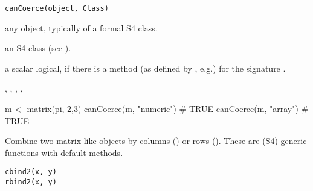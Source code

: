 %
\begin{Usage}
\begin{verbatim}
canCoerce(object, Class)
\end{verbatim}
\end{Usage}
%
\begin{Arguments}
\begin{ldescription}
\item[\code{object}] any \R{} object, typically of a formal S4 class.
\item[\code{Class}] an S4 class (see ).
\end{ldescription}
\end{Arguments}
%
\begin{Value}
a scalar logical,  if there is a  method
(as defined by , e.g.) for the signature
.
\end{Value}
%
\begin{SeeAlso}\relax
{}, ,
, ,
\end{SeeAlso}
%
\begin{Examples}
\begin{ExampleCode}
m <- matrix(pi, 2,3)
canCoerce(m, "numeric") # TRUE
canCoerce(m, "array")   # TRUE
\end{ExampleCode}
\end{Examples}
%
\begin{Description}\relax
Combine two matrix-like \R{} objects by columns ()
or rows (). These are (S4) generic functions with default
methods.
\end{Description}
%
\begin{Usage}
\begin{verbatim}
cbind2(x, y)
rbind2(x, y)
\end{verbatim}
\end{Usage}
